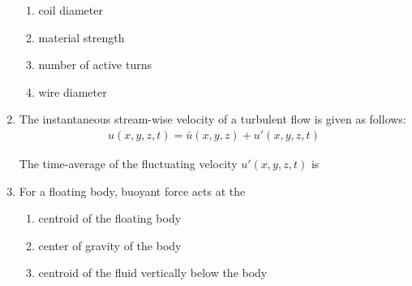 \documentclass[journal,11pt,onecolumn]{IEEEtran}
\begin{document}
\begin{enumerate}
          \begin{enumerate}

              \item coil diameter

              \item material strength

              \item number of active turns

              \item wire diameter

          \end{enumerate}

    \item The instantaneous stream-wise velocity of a turbulent flow is given as follows:
          \begin{align}
              u(x,y,z,t) = \bar{u}(x,y,z) + u'(x,y,z,t)
          \end{align}

          The time-average of the fluctuating velocity $u'(x,y,z,t)$ is

          \begin{enumerate}


          \end{enumerate}

    \item For a floating body, buoyant force acts at the

          \begin{enumerate}

              \item centroid of the floating body

              \item center of gravity of the body

              \item centroid of the fluid vertically below the body


\end{enumerate}
\end{enumerate}
\end{document}
